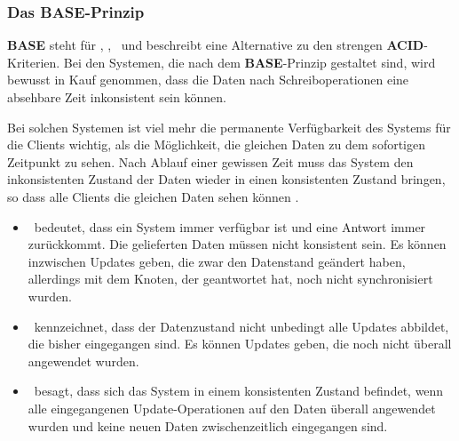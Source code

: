 %

\subsubsection{Das BASE-Prinzip}\label{base}

\textbf{BASE} steht für \BAse, \baSe, \basE\ und beschreibt eine Alternative zu den strengen \textbf{ACID}-Kriterien.
Bei den Systemen, die nach dem \textbf{BASE}-Prinzip gestaltet sind, wird bewusst in Kauf genommen, dass die Daten nach Schreiboperationen eine absehbare Zeit inkonsistent sein können.

Bei solchen Systemen ist viel mehr die permanente Verfügbarkeit des Systems für die Clients wichtig, als die Möglichkeit, die gleichen Daten zu dem sofortigen Zeitpunkt zu sehen. Nach Ablauf einer gewissen Zeit muss das System den inkonsistenten Zustand der Daten wieder in einen konsistenten Zustand bringen, so dass alle Clients die gleichen Daten sehen können \cite{base}.

\begin{itemize}
\item \BAse\ bedeutet, dass ein System immer verfügbar ist und eine Antwort immer zurückkommt. Die gelieferten Daten müssen nicht konsistent sein. Es können inzwischen Updates geben, die zwar den Datenstand geändert haben, allerdings mit dem Knoten, der geantwortet hat, noch nicht synchronisiert wurden.

\item \baSe\ kennzeichnet, dass der Datenzustand nicht unbedingt alle Updates abbildet, die bisher eingegangen sind. Es können Updates geben, die noch nicht überall angewendet wurden.

\item \basE\ besagt, dass sich das System in einem konsistenten Zustand befindet, wenn alle eingegangenen Update-Operationen auf den Daten überall angewendet wurden und keine neuen Daten zwischenzeitlich eingegangen sind.\cite{acidVSBase}
\end{itemize}


